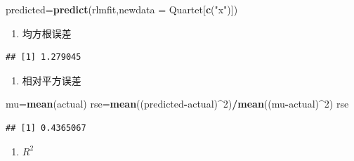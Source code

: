 \documentclass[
]{article}
\newenvironment{Shaded}{\begin{snugshade}}{\end{snugshade}}
\newcommand{\DataTypeTok}[1]{\textcolor[rgb]{0.13,0.29,0.53}{#1}}
\newcommand{\DecValTok}[1]{\textcolor[rgb]{0.00,0.00,0.81}{#1}}
\newcommand{\FloatTok}[1]{\textcolor[rgb]{0.00,0.00,0.81}{#1}}
\newcommand{\KeywordTok}[1]{\textcolor[rgb]{0.13,0.29,0.53}{\textbf{#1}}}
\newcommand{\NormalTok}[1]{#1}
\newcommand{\OperatorTok}[1]{\textcolor[rgb]{0.81,0.36,0.00}{\textbf{#1}}}
\newcommand{\StringTok}[1]{\textcolor[rgb]{0.31,0.60,0.02}{#1}}
\providecommand{\tightlist}{%
  \setlength{\itemsep}{0pt}\setlength{\parskip}{0pt}}
\begin{document}
\begin{Shaded}
\begin{Highlighting}[]
\NormalTok{predicted=}\KeywordTok{predict}\NormalTok{(rlmfit,}\DataTypeTok{newdata =}\NormalTok{ Quartet[}\KeywordTok{c}\NormalTok{(}\StringTok{"x"}\NormalTok{)])}
\end{Highlighting}
\end{Shaded}

\begin{enumerate}
\def\labelenumi{\arabic{enumi}.}
\setcounter{enumi}{8}
\tightlist
\item
  均方根误差
\end{enumerate}

\begin{Shaded}
\end{Shaded}

\begin{verbatim}
## [1] 1.279045
\end{verbatim}

\begin{enumerate}
\def\labelenumi{\arabic{enumi}.}
\setcounter{enumi}{9}
\tightlist
\item
  相对平方误差
\end{enumerate}

\begin{Shaded}
\begin{Highlighting}[]
\NormalTok{mu=}\KeywordTok{mean}\NormalTok{(actual)}
\NormalTok{rse=}\KeywordTok{mean}\NormalTok{((predicted}\OperatorTok{-}\NormalTok{actual)}\OperatorTok{^}\DecValTok{2}\NormalTok{)}\OperatorTok{/}\KeywordTok{mean}\NormalTok{((mu}\OperatorTok{-}\NormalTok{actual)}\OperatorTok{^}\DecValTok{2}\NormalTok{)}
\NormalTok{rse}
\end{Highlighting}
\end{Shaded}

\begin{verbatim}
## [1] 0.4365067
\end{verbatim}

\begin{enumerate}
\def\labelenumi{\arabic{enumi}.}
\setcounter{enumi}{10}
\tightlist
\item
  \(R^2\)
\end{enumerate}
\end{document}
